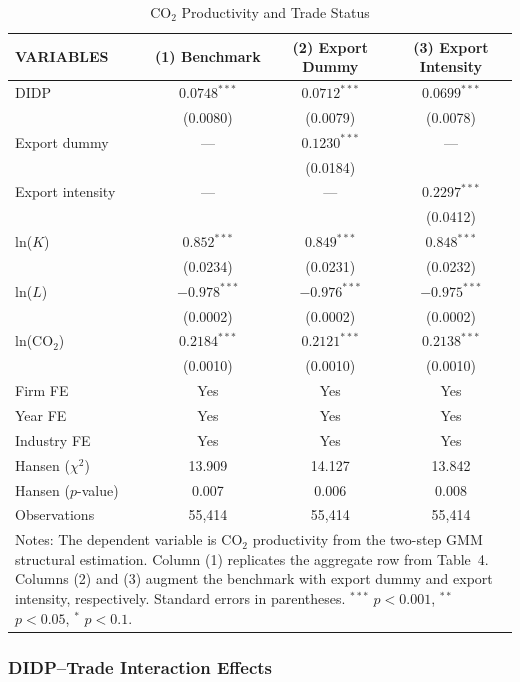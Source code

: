\documentclass[11pt,a4paper]{article}
\begin{document}
\begin{table}[htbp]
\centering
\caption{CO$_2$ Productivity and Trade Status}
\label{tab:trade_status}
\begin{tabular}{lccc}
\toprule
VARIABLES & (1) Benchmark & (2) Export Dummy & (3) Export Intensity \\
\midrule
DIDP             & $0.0748^{***}$ & $0.0712^{***}$ & $0.0699^{***}$ \\
                 & (0.0080) & (0.0079) & (0.0078) \\
Export dummy     & ---      & $0.1230^{***}$ & --- \\
                 &          & (0.0184) & \\
Export intensity & ---      & ---      & $0.2297^{***}$ \\
                 &          &          & (0.0412) \\
ln($K$)          & $0.852^{***}$ & $0.849^{***}$ & $0.848^{***}$ \\
                 & (0.0234) & (0.0231) & (0.0232) \\
ln($L$)          & $-0.978^{***}$ & $-0.976^{***}$ & $-0.975^{***}$ \\
                 & (0.0002) & (0.0002) & (0.0002) \\
ln(CO$_2$)       & $0.2184^{***}$ & $0.2121^{***}$ & $0.2138^{***}$ \\
                 & (0.0010) & (0.0010) & (0.0010) \\
Firm FE          & Yes & Yes & Yes \\
Year FE          & Yes & Yes & Yes \\
Industry FE      & Yes & Yes & Yes \\
Hansen ($\chi^2$)    & 13.909 & 14.127 & 13.842 \\
Hansen ($p$-value)   & 0.007  & 0.006  & 0.008  \\
Observations     & 55{,}414 & 55{,}414 & 55{,}414 \\
\bottomrule
\multicolumn{4}{p{0.75\textwidth}}{\footnotesize Notes: The dependent variable is CO$_2$ productivity from the two-step GMM structural estimation. Column (1) replicates the aggregate row from Table~4. Columns (2) and (3) augment the benchmark with export dummy and export intensity, respectively. Standard errors in parentheses. $^{***}$ $p<0.001$, $^{**}$ $p<0.05$, $^{*}$ $p<0.1$.}
\end{tabular}
\end{table}


\subsubsection{DIDP--Trade Interaction Effects}
\end{document}
